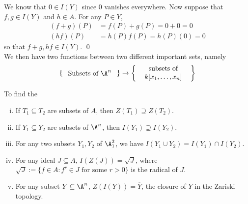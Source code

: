 \pf We know that $0 \in I(Y)$ since 0 vanishes everywhere. Now suppose that $f,g \in I(Y)$ and $h \in A$.  For any $P \in Y$, 
	\[
	\begin{split}
	(f+g)(P)&= f(P) + g(P)= 0 + 0= 0 \\
	(hf)(P)&= h(P)f(P)= h(P)(0)= 0
	\end{split}
	\]
so that $f+g, hf \in I(Y)$. \qed \\


We then have two functions between two different important sets, namely
        \begin{align}
        \left\{ 
        \parbox[c]{1.1in}{\centering Subsets of $\A^n$}
        \right\}
        \rightarrow
        \left\{ 
        \parbox[c]{1.1in}{\centering subsets of \\ $k[x_1,\ldots,x_n]$}
        \right\}
        \end{align}


To find the 



\begin{prop} \hfill
\begin{enumerate}[(i)]
\item If $T_1 \subseteq T_2$ are subsets of $A$, then $Z(T_1) \supseteq Z(T_2)$.
\item If $Y_1 \subseteq Y_2$ are subsets of $\A^n$, then $I(Y_1) \supseteq I(Y_2)$.
\item For any two subsets $Y_1,Y_2$ of $\A_1^2$, we have $I(Y_1 \cup Y_2)= I(Y_1) \cap I(Y_2)$. 
\item For any ideal $J \subseteq A$, $I(Z(J))= \sqrt{J}$, where $\sqrt{J}:= \{ f \in A \colon f^r \in J \text{ for some } r>0 \}$ is the radical of $J$. 
\item For any subset $Y \subseteq \A^n$, $Z(I(Y))= \overline{Y}$, the closure of $Y$ in the Zariski topology. 
\end{enumerate}
\end{prop}

